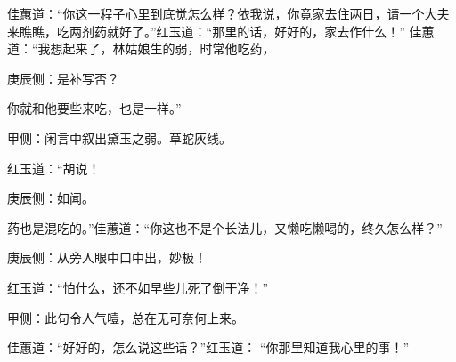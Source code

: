 \begin{parag}
    佳蕙道：“你这一程子心里到底觉怎么样？依我说，你竟家去住两日，请一个大夫来瞧瞧，吃两剂药就好了。”红玉道：“那里的话，好好的，家去作什么！” 佳蕙道：“我想起来了，林姑娘生的弱，时常他吃药，\begin{note}庚辰侧：是补写否？\end{note}你就和他要些来吃，也是一样。”\begin{note}甲侧：闲言中叙出黛玉之弱。草蛇灰线。\end{note}红玉道：“胡说！\begin{note}庚辰侧：如闻。\end{note}药也是混吃的。”佳蕙道：“你这也不是个长法儿，又懒吃懒喝的，终久怎么样？”\begin{note}庚辰侧：从旁人眼中口中出，妙极！\end{note}红玉道：“怕什么，还不如早些儿死了倒干净！”\begin{note}甲侧：此句令人气噎，总在无可奈何上来。\end{note}佳蕙道：“好好的，怎么说这些话？”红玉道： “你那里知道我心里的事！”
\end{parag}


